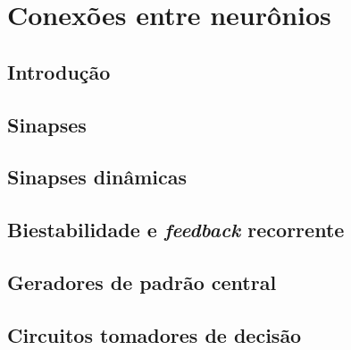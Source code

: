 \chapter{Conexões entre neurônios}\label{cap:conexoes}
\section{Introdução}\label{sec:conexoes_intro}

\section{Sinapses}\label{sec:sinapses}

\section{Sinapses dinâmicas}\label{sec:dinamicas}

\section{Biestabilidade e \textit{feedback} recorrente}\label{sec:biestabilidade}

\section{Geradores de padrão central}\label{sec:geradores}

\section{Circuitos tomadores de decisão}\label{sec:decisao}
